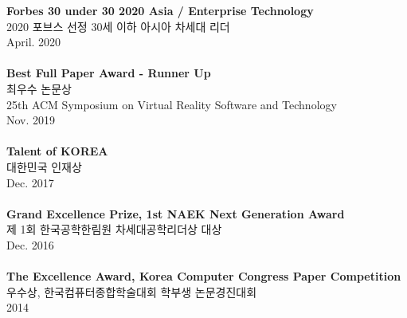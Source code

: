 \documentclass[letterpaper,11pt,oneside]{article}
\begin{document}
\normalsize \textbf{Forbes 30 under 30 2020 Asia / Enterprise Technology} \\
2020 포브스 선정 30세 이하 아시아 차세대 리더 \\ 
April. 2020 \\
\\
\normalsize \textbf{Best Full Paper Award - Runner Up} \\
최우수 논문상 \\
25th ACM Symposium on Virtual Reality Software and Technology \\ 
Nov. 2019 \\
\\
\textbf{Talent of KOREA} \\
대한민국 인재상 \\
Dec. 2017 \\
\\
\textbf{Grand Excellence Prize, 1st NAEK Next Generation Award}\\
제 1회 한국공학한림원 차세대공학리더상 대상 \\
Dec. 2016 \\
\\
\textbf{The Excellence Award, Korea Computer Congress Paper Competition}\\
우수상, 한국컴퓨터종합학술대회 학부생 논문경진대회 \\
2014 \\
\\
\\

\clearpage
\setlength\parindent{0cm}
\end{document}
